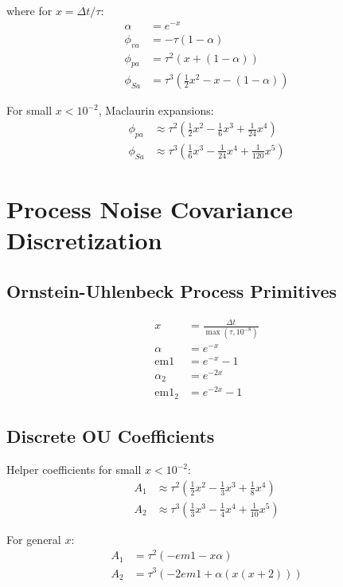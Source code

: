 \documentclass{article}
\begin{document}
where for $x = \Delta t/\tau$:
\begin{align}
\alpha &= e^{-x} \\
\phi_{va} &= -\tau(1 - \alpha) \\
\phi_{pa} &= \tau^2(x + (1 - \alpha)) \\
\phi_{Sa} &= \tau^3\left(\frac{1}{2}x^2 - x - (1 - \alpha)\right)
\end{align}

For small $x < 10^{-2}$, Maclaurin expansions:
\begin{align}
\phi_{pa} &\approx \tau^2\left(\frac{1}{2}x^2 - \frac{1}{6}x^3 + \frac{1}{24}x^4\right) \\
\phi_{Sa} &\approx \tau^3\left(\frac{1}{6}x^3 - \frac{1}{24}x^4 + \frac{1}{120}x^5\right)
\end{align}

\section{Process Noise Covariance Discretization}

\subsection{Ornstein-Uhlenbeck Process Primitives}

\begin{align}
x &= \frac{\Delta t}{\max(\tau, 10^{-8})} \\
\alpha &= e^{-x} \\
\text{em1} &= e^{-x} - 1 \\
\alpha_2 &= e^{-2x} \\
\text{em1}_2 &= e^{-2x} - 1
\end{align}

\subsection{Discrete OU Coefficients}

Helper coefficients for small $x < 10^{-2}$:
\begin{align}
A_1 &\approx \tau^2\left(\frac{1}{2}x^2 - \frac{1}{3}x^3 + \frac{1}{8}x^4\right) \\
A_2 &\approx \tau^3\left(\frac{1}{3}x^3 - \frac{1}{4}x^4 + \frac{1}{10}x^5\right)
\end{align}

For general $x$:
\begin{align}
A_1 &= \tau^2(-em1 - x\alpha) \\
A_2 &= \tau^3(-2em1 + \alpha(x(x+2)))
\end{align}
\end{document}
